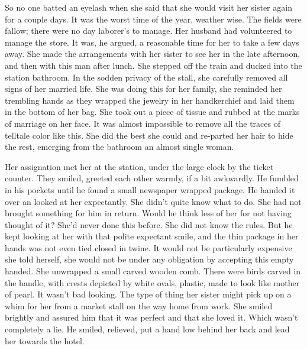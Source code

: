 \documentclass{article}
\begin{document}
So no one batted an eyelash when she said that she would visit her sister again for a couple days. It was the worst time of the year, weather wise. The fields were fallow; there were no day laborer's to manage. Her husband had volunteered to manage the store. It was, he argued, a reasonable time for her to take a few days away. She made the arrangements with her sister to see her in the late afternoon, and then with this man after lunch. She stepped off the train and ducked into the station bathroom. In the sodden privacy of the stall, she carefully removed all signs of her married life. She was doing this for her family, she reminded her trembling hands as they wrapped the jewelry in her handkerchief and laid them in the bottom of her bag. She took out a piece of tissue and rubbed at the marks of marriage on her face. It was almost impossible to remove all the traces of telltale color like this. She did the best she could and re-parted her hair to hide the rest, emerging from the bathroom an almost single woman.

Her assignation met her at the station, under the large clock by the ticket counter. They smiled, greeted each other warmly, if a bit awkwardly. He fumbled in his pockets until he found a small newspaper wrapped package. He handed it over an looked at her expectantly. She didn't quite know what to do. She had not brought something for him in return. Would he think less of her for not having thought of it? She'd never done this before. She did not know the rules. But he kept looking at her with that polite expectant smile, and the thin package in her hands was not even tied closed in twine. It would not be particularly expensive she told herself, she would not be under any obligation by accepting this empty handed. She unwrapped a small carved wooden comb. There were birds carved in the handle, with crests depicted by white ovals, plastic, made to look like mother of pearl. It wasn't bad looking. The type of thing her sister might pick up on a whim for her from a market stall on the way home from work. She smiled brightly and assured him that it was perfect and that she loved it. Which wasn't completely a lie. He smiled, relieved, put a hand low behind her back and lead her towards the hotel. 
\end{document}
